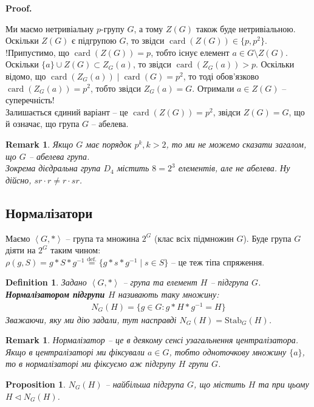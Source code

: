 \documentclass[a4paper, 10pt]{article}
\makeatletter
\theoremstyle{theoremdd}
\theoremstyle{theoremdd}
\newtheorem{definition}[theorem]{Definition}
\theoremstyle{theoremdd}
\theoremstyle{theoremdd}
\theoremstyle{theoremdd}
\theoremstyle{theoremdd}
\theoremstyle{theoremdd}
\theoremstyle{theoremdd}
\theoremstyle{theoremdd}
\newtheorem{proposition}[theorem]{Proposition}
\theoremstyle{theoremdd}
\theoremstyle{theoremdd}
\newtheorem{remark}[theorem]{Remark}
\theoremstyle{theoremdd}
\theoremstyle{theoremdd}
\theoremstyle{theoremdd}
\theoremstyle{theoremdd}
\renewenvironment{proof}[1][Proof.\\]{\par
\pushQED{\hfill \qed}%
\normalfont \topsep6\p@\@plus6\p@\relax
\trivlist
\item\relax
{\bfseries
#1\@addpunct{.}}\hspace\labelsep\ignorespaces
}{%
\popQED\endtrivlist\@endpefalse
}
\DeclareMathOperator{\card}{card}
\newcommand{\eqbydef}{\overset{\text{def.}}{=}}
\newcommand\Stab{\text{Stab}}
\makeatother
\begin{document}
\begin{proof}
Ми маємо нетривіальну $p$-групу $G$, а тому $Z(G)$ також буде нетривіальною. Оскільки $Z(G)$ є підгрупою $G$, то звідси $\card(Z(G)) \in \{p,p^2\}$.\\
!Припустимо, що $\card(Z(G)) = p$, тобто існує елемент $a \in G \setminus Z(G)$. Оскільки $\{a\} \cup Z(G) \subset Z_G(a)$, то звідси $\card(Z_G(a)) > p$. Оскільки відомо, що $\card(Z_G(a)) \mid \card(G) = p^2$, то тоді обов'язково $\card(Z_G(a)) = p^2$, тобто звідси $Z_G(a) = G$. Отримали $a \in Z(G)$ -- суперечність!\\
Залишається єдиний варіант -- це $\card(Z(G)) = p^2$, звідси $Z(G) = G$, що й означає, що група $G$ -- абелева.
\end{proof}

\begin{remark}
Якщо $G$ має порядок $p^k, k > 2$, то ми не можемо сказати загалом, що $G$ -- абелева група.\\
Зокрема дієдральна група $D_4$ містить $8 = 2^3$ елементів, але не абелева. Ну дійсно, $sr \cdot r \neq r \cdot sr$.
\end{remark}

\subsection{Нормалізатори}
Маємо $\left<G,*\right>$ -- група та множина $2^G$ (клас всіх підмножин $G$). Буде група $G$ діяти на $2^G$ таким чином:\\
$\rho(g,S) = g*S*g^{-1} \eqbydef \{g*s*g^{-1} \mid s \in S\}$ -- це теж тіпа спряження.

\begin{definition}
Задано $\left< G, *\right>$ -- група та елемент $H$ -- підгрупа $G$.\\
\textbf{Нормалізатором підгрупи $H$} називають таку множину:
\begin{align*}
N_G(H) = \{g \in G: g*H*g^{-1} = H\}
\end{align*}
Зважаючи, яку ми дію задали, тут насправді $N_G(H) = \Stab_G(H)$.
\end{definition}

\begin{remark}
Нормалізатор -- це в деякому сенсі узагальнення централізатора. Якщо в централізаторі ми фіксували $a \in G$, тобто одноточкову множину $\{a\}$, то в нормалізаторі ми фіксуємо аж підгрупу $H$ групи $G$.
\end{remark}

\begin{proposition}
$N_G(H)$ -- найбільша підгрупа $G$, що містить $H$ та при цьому $H \triangleleft N_G(H)$.
\end{proposition}
\end{document}
